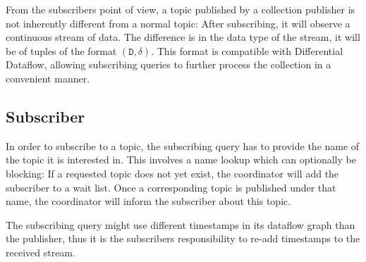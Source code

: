 From the subscribers point of view, a topic published by a collection publisher
is not inherently different from a normal topic: After subscribing, it will
observe a continuous stream of data. The difference is in the data type of the
stream, it will be of tuples of the format $(\texttt{D}, \delta)$. This format
is compatible with Differential Dataflow, allowing subscribing queries to
further process the collection in a convenient manner.


\subsection{Subscriber}

In order to subscribe to a topic, the subscribing query has to provide the name
of the topic it is interested in. This involves a name lookup which can optionally
be blocking: If a requested topic does not yet exist, the coordinator will add
the subscriber to a wait list. Once a corresponding topic is published under that
name, the coordinator will inform the subscriber about this topic. 

The subscribing query might use different timestamps in its dataflow graph
than the publisher, thus it is the subscribers responsibility to re-add
timestamps to the received stream. 




